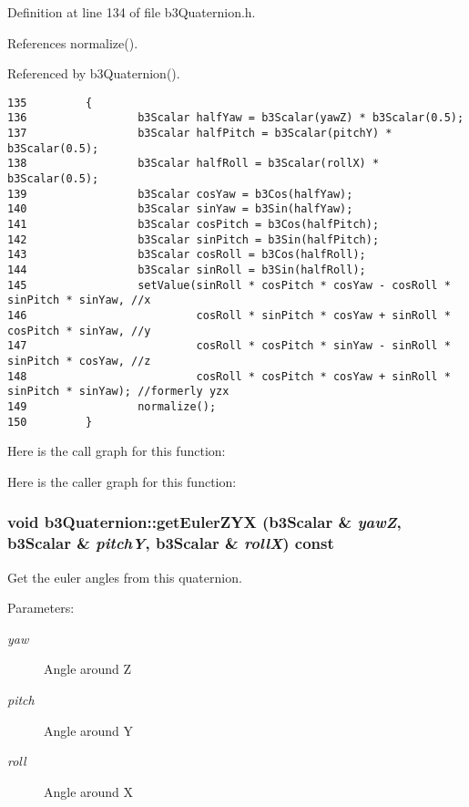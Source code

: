 Definition at line 134 of file b3Quaternion.h.

References normalize().

Referenced by b3Quaternion().

\begin{Code}\begin{verbatim}135         {
136                 b3Scalar halfYaw = b3Scalar(yawZ) * b3Scalar(0.5);  
137                 b3Scalar halfPitch = b3Scalar(pitchY) * b3Scalar(0.5);  
138                 b3Scalar halfRoll = b3Scalar(rollX) * b3Scalar(0.5);  
139                 b3Scalar cosYaw = b3Cos(halfYaw);
140                 b3Scalar sinYaw = b3Sin(halfYaw);
141                 b3Scalar cosPitch = b3Cos(halfPitch);
142                 b3Scalar sinPitch = b3Sin(halfPitch);
143                 b3Scalar cosRoll = b3Cos(halfRoll);
144                 b3Scalar sinRoll = b3Sin(halfRoll);
145                 setValue(sinRoll * cosPitch * cosYaw - cosRoll * sinPitch * sinYaw, //x
146                          cosRoll * sinPitch * cosYaw + sinRoll * cosPitch * sinYaw, //y
147                          cosRoll * cosPitch * sinYaw - sinRoll * sinPitch * cosYaw, //z
148                          cosRoll * cosPitch * cosYaw + sinRoll * sinPitch * sinYaw); //formerly yzx
149                 normalize();
150         }
\end{verbatim}
\end{Code}




Here is the call graph for this function:

Here is the caller graph for this function:\hypertarget{classb3_quaternion_6d11b2745e4a668ef7a1d6dd9d97f621}{
\subsubsection[getEulerZYX]{\setlength{\rightskip}{0pt plus 5cm}void b3Quaternion::getEulerZYX (b3Scalar \& {\em yawZ}, \/  b3Scalar \& {\em pitchY}, \/  b3Scalar \& {\em rollX}) const}}
\label{classb3_quaternion_6d11b2745e4a668ef7a1d6dd9d97f621}


Get the euler angles from this quaternion. 

\begin{Desc}
\item[Parameters:]
\begin{description}
\item[{\em yaw}]Angle around Z \item[{\em pitch}]Angle around Y \item[{\em roll}]Angle around X \end{description}
\end{Desc}


